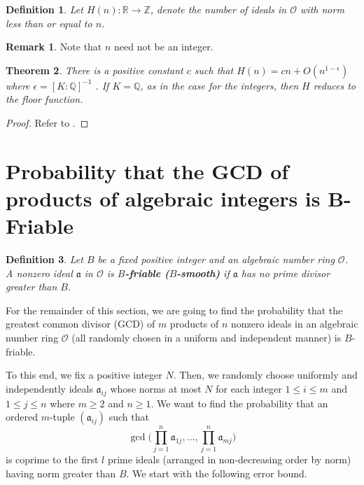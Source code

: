 \documentclass[12pt]{amsart}
\newtheorem{theorem}{Theorem}[subsection]
\newtheorem{definition}[theorem]{Definition}
\theoremstyle{definition}
\newtheorem*{remark}{Remark}
\begin{document}
\begin{definition} \label{H}
	Let \(H(n):\mathbb{R} \to \mathbb{Z}\), denote the number of ideals in \(\mathcal{O}\) with norm less than or equal to \(n\).
\end{definition}

\begin{remark}
	Note that \(n\) need not be an integer.
\end{remark}

\begin{theorem} There is a positive constant \(c\) such that \(H(n)=cn+O(n^{1-\epsilon})\) where \(\epsilon = [K : \mathbb{Q}]^{-1}\) \label{H-estimate}. If \(K=\mathbb{Q}\), as in the case for the integers, then \(H\) reduces to the floor function.
\end{theorem}
\begin{proof}
	Refer to \cite{Marcus}.
\end{proof}

\section{Probability that the GCD of products of algebraic integers is B-Friable}

\begin{definition} Let $B$ be a fixed positive integer and an algebraic number ring $\mathcal{O}$. A nonzero ideal $\mathfrak{a}$ in $\mathcal{O}$ is \textbf{$B$-friable ($B$-smooth)} if $\mathfrak{a}$ has no prime divisor greater than $B$. 
\end{definition}
For the remainder of this section, we are going to find the probability that the greatest common divisor (GCD) of $m$ products of $n$ nonzero ideals in an algebraic number ring $\mathcal{O}$ (all randomly chosen in a uniform and independent manner) is $B$-friable. 

\vspace{.1 in}

To this end, we fix a positive integer $N$. Then, we randomly choose uniformly and independently ideals $\mathfrak{a}_{ij}$ whose norms at most $N$ for each integer $1 \leq i \leq m$ and $1 \leq j \leq n$ where $m \geq 2$ and $n \geq 1$. We want to find the probability that an ordered $m$-tuple $(\mathfrak{a}_{ij})$ such that 
$$\gcd\Big(\prod_{j=1}^n \mathfrak{a}_{1j}, ..., \prod_{j=1}^n \mathfrak{a}_{mj}\Big)$$
is coprime to the first $l$ prime ideals (arranged in non-decreasing order by norm) having norm greater than $B$. We start with the following error bound.
\end{document}
